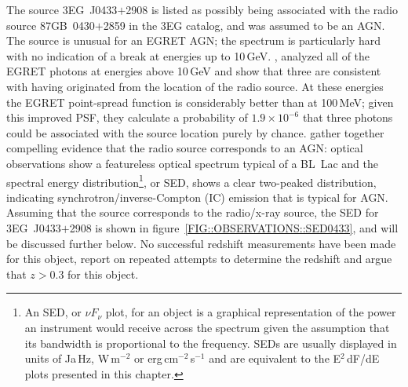The \Gray source 3EG~J0433$+$2908 is listed as possibly being
associated with the radio source 87GB~0430$+$2859 in the 3EG catalog,
and was assumed to be an AGN. The \Gray source is unusual for an EGRET
AGN; the spectrum is particularly hard with no indication of a break
at energies up to 10\,GeV. \citet{REF::DINGUS::GAMMA2001}, analyzed
all of the EGRET photons at energies above 10\,GeV and show that three
are consistent with having originated from the location of the radio
source. At these energies the EGRET point-spread function is
considerably better than at 100\,MeV; given this improved PSF, they
calculate a probability of $1.9\times10^{-6}$ that three photons could
be associated with the source location purely by chance.
\citet{REF::WALLACE::GAMMA2001} gather together  compelling evidence 
that the radio source corresponds to an AGN: optical observations show
a featureless optical spectrum typical of a BL~Lac and the spectral
energy distribution\footnote{An SED, or $\nu F_\nu$ plot, for an
object is a graphical representation of the power an instrument would
receive across the spectrum given the assumption that its bandwidth is
proportional to the frequency. SEDs are usually displayed in units of
Ja\,Hz, W\,m$^{-2}$ or erg\,cm$^{-2}$\,s$^{-1}$ and are equivalent to
the E$^2$\,dF/dE plots presented in this chapter.}, or SED, shows a
clear two-peaked distribution, indicating synchrotron/inverse-Compton
(IC) emission that is typical for AGN. Assuming that the \Gray source
corresponds to the radio/x-ray source, the SED for 3EG~J0433$+$2908 is
shown in figure~\ref{FIG::OBSERVATIONS::SED0433}, and will be
discussed further below. No successful redshift measurements have been
made for this object, \citet{REF::HALPERN::AJ2003} report on repeated
attempts to determine the redshift and argue that $z>0.3$ for this object.


